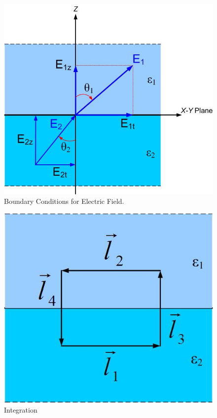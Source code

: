 \documentclass{ximera}
\begin{document}
\begin{figure}[htbp]
\begin{center}
\includegraphics[scale=0.5]{../jpg/boundaryconditions.jpg}
\end{center}
\caption{Boundary Conditions for Electric Field.}
\label{BoundaryCondition}
\end{figure}





\begin{figure}[htbp]
\begin{center}
\includegraphics[scale=0.5]{../jpg/integrationpathtangfield.jpg}
\end{center}
\caption{Integration}
\label{BoundaryCondition}
\end{figure}
\end{document}
